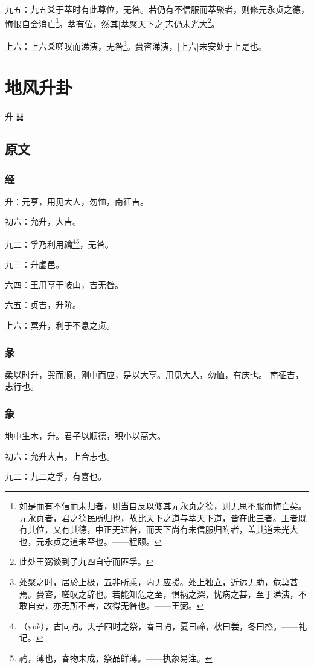 \documentclass[12pt,oneside]{book}
\begin{document}
九五：九五爻于萃时有此尊位，无咎。若仍有不信服而萃聚者，则修元永贞之德，悔恨自会消亡\footnote{如是而有不信而未归者，则当自反以修其元永贞之德，则无思不服而悔亡矣。元永贞者，君之德民所归也，故比天下之道与萃天下道，皆在此三者。王者既有其位，又有其德，中正无过咎，而天下尚有未信服归附者，盖其道未光大也，元永贞之道未至也。——程颐。}。萃有位，然其[萃聚天下之]志仍未光大\footnote{此处王弼谈到了九四自守而匪孚。}。

上六：上六爻嗟叹而涕洟，无咎\footnote{处聚之时，居於上极，五非所乘，内无应援。处上独立，近远无助，危莫甚焉。赍咨，嗟叹之辞也。若能知危之至，惧祸之深，忧病之甚，至于涕洟，不敢自安，亦无所不害，故得无咎也。——王弼。}。赍咨涕洟，[上六]未安处于上是也。


\chapter{地风升卦}
升 {\Large ䷭}

\section{原文}

\subsection{经}
升：元亨，用见大人，勿恤，南征吉。

初六：允升，大吉。

九二：孚乃利用禴\footnote{（yuè），古同礿。天子四时之祭，春曰礿，夏曰禘，秋曰尝，冬曰烝。——礼记。}\footnote{礿，薄也，春物未成，祭品鲜薄。——执象易注。}，无咎。

九三：升虚邑。

六四：王用亨于岐山，吉无咎。

六五：贞吉，升阶。

上六：冥升，利于不息之贞。


\subsection{彖}
柔以时升，巽而顺，刚中而应，是以大亨。用见大人，勿恤，有庆也。 南征吉，志行也。

\subsection{象}
地中生木，升。君子以顺德，积小以高大。

初六：允升大吉，上合志也。

九二：九二之孚，有喜也。
\end{document}
